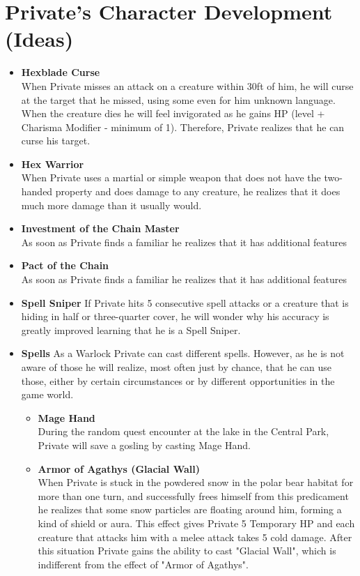 \section*{Private's Character Development (Ideas)}
\begin{itemize}
	\item \textbf{Hexblade Curse}\\
	When Private misses an attack on a creature within 30ft of him, he will curse at the target that he missed, using some even for him unknown language. When the creature dies he will feel invigorated as he gains HP (level + Charisma Modifier - minimum of 1). Therefore, Private realizes that he can curse his target.
	\item \textbf{Hex Warrior}\\
	When Private uses a martial or simple weapon that does not have the two-handed property and does damage to any creature, he realizes that it does much more damage than it usually would.
	\item \textbf{Investment of the Chain Master}\\
	As soon as Private finds a familiar he realizes that it has additional features
	\item \textbf{Pact of the Chain}\\
	As soon as Private finds a familiar he realizes that it has additional features
	\item \textbf{Spell Sniper}
	If Private hits 5 consecutive spell attacks or a creature that is hiding in half or three-quarter cover, he will wonder why his accuracy is greatly improved learning that he is a Spell Sniper.
	\item \textbf{Spells}
	As a Warlock Private can cast different spells. However, as he is not aware of those he will realize, most often just by chance, that he can use those, either by certain circumstances or by different opportunities in the game world.
	\begin{itemize}
		\item \textcolor{titlered}{\textbf{Mage Hand}}\\
		During the random quest encounter at the lake in the Central Park, Private will save a gosling by casting Mage Hand.
		\item \textcolor{titlered}{\textbf{Armor of Agathys (Glacial Wall)}}\\
		When Private is stuck in the powdered snow in the polar bear habitat for more than one turn, and successfully frees himself from this predicament he realizes that some snow particles are floating around him, forming a kind of shield or aura. This effect gives Private 5 Temporary HP and each creature that attacks him with a melee attack takes 5 cold damage. After this situation Private gains the ability to cast "Glacial Wall", which is indifferent from the effect of "Armor of Agathys".

\end{itemize}
\end{itemize}
